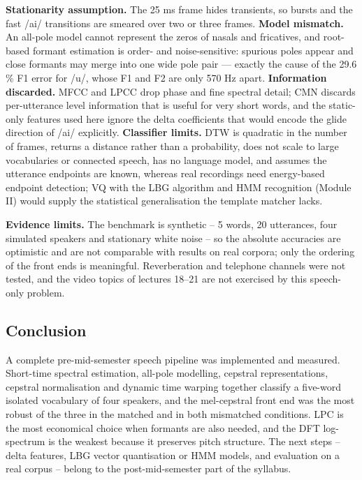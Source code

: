 \documentclass[
]{article}
\begin{document}
\textbf{Stationarity assumption.} The 25 ms frame hides transients, so
bursts and the fast /ai/ transitions are smeared over two or three
frames. \textbf{Model mismatch.} An all-pole model cannot represent the
zeros of nasals and fricatives, and root-based formant estimation is
order- and noise-sensitive: spurious poles appear and close formants may
merge into one wide pole pair --- exactly the cause of the 29.6 \% F1
error for /u/, whose F1 and F2 are only 570 Hz apart.
\textbf{Information discarded.} MFCC and LPCC drop phase and fine
spectral detail; CMN discards per-utterance level information that is
useful for very short words, and the static-only features used here
ignore the delta coefficients that would encode the glide direction of
/ai/ explicitly. \textbf{Classifier limits.} DTW is quadratic in the
number of frames, returns a distance rather than a probability, does not
scale to large vocabularies or connected speech, has no language model,
and assumes the utterance endpoints are known, whereas real recordings
need energy-based endpoint detection; VQ with the LBG algorithm and HMM
recognition (Module II) would supply the statistical generalisation the
template matcher lacks.

\textbf{Evidence limits.} The benchmark is synthetic -- 5 words, 20
utterances, four simulated speakers and stationary white noise -- so the
absolute accuracies are optimistic and are not comparable with results
on real corpora; only the ordering of the front ends is meaningful.
Reverberation and telephone channels were not tested, and the video
topics of lectures 18--21 are not exercised by this speech-only problem.

\subsection{Conclusion}\label{conclusion}

A complete pre-mid-semester speech pipeline was implemented and
measured. Short-time spectral estimation, all-pole modelling, cepstral
representations, cepstral normalisation and dynamic time warping
together classify a five-word isolated vocabulary of four speakers, and
the mel-cepstral front end was the most robust of the three in the
matched and in both mismatched conditions. LPC is the most economical
choice when formants are also needed, and the DFT log-spectrum is the
weakest because it preserves pitch structure. The next steps -- delta
features, LBG vector quantisation or HMM models, and evaluation on a
real corpus -- belong to the post-mid-semester part of the syllabus.
\end{document}
